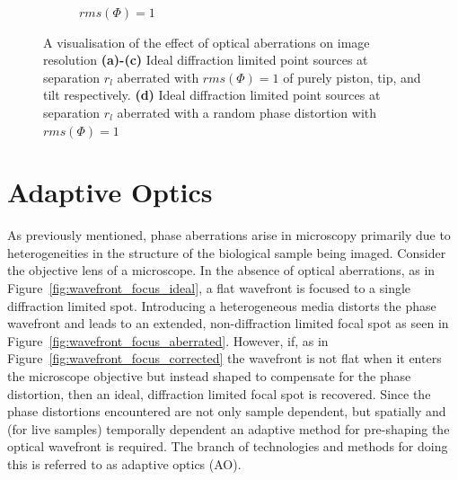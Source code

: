 \begin{figure}
\begin{subfigure}{0.49\textwidth}
		\caption{$rms(\Phi) = 1$}
		\label{fig:Airy_ring_2D_2_object_seperation_aberration_comparison_rms_1}
	\end{subfigure}
	\caption[A visualisation of the effect of optical aberrations on image 
	resolution]{A visualisation of the effect of optical aberrations on 
		image resolution \textbf{(a)-(c)} Ideal diffraction limited point 
		sources at separation $r_{l}$ aberrated with $rms(\Phi) = 1$ of purely 
		piston, tip, and tilt respectively. \textbf{(d)} Ideal diffraction 
		limited point sources at separation $r_{l}$ aberrated with a random 
		phase distortion with $rms(\Phi) = 1$}
	\label{fig:aberrations_res}
\end{figure}

\section{Adaptive Optics}
\label{sec:AO}

As previously mentioned, phase aberrations arise in microscopy primarily
due to heterogeneities in the structure of the biological sample being 
imaged. Consider the objective lens of a microscope. In the absence of
optical aberrations, as in Figure~\ref{fig:wavefront_focus_ideal}, a flat
wavefront is focused to a single diffraction limited spot. Introducing
a heterogeneous media distorts the phase wavefront and leads to an 
extended, non-diffraction limited focal spot as seen in 
Figure~\ref{fig:wavefront_focus_aberrated}. However, if, as in 
Figure~\ref{fig:wavefront_focus_corrected} the wavefront is not flat when 
it enters the microscope objective but instead shaped to compensate for 
the phase distortion, then an ideal, diffraction limited focal spot is 
recovered. Since the phase distortions encountered are not only sample
dependent, but spatially and (for live samples) temporally dependent an
adaptive method for pre-shaping the optical wavefront is 
required\cite{schwertner2004characterizing,wang2014multiplexed,girkin2009adaptive}.
The branch of technologies and methods for doing this is referred to as
adaptive optics (AO).

